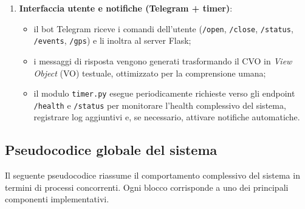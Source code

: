 \begin{enumerate}
\begin{itemize}
                risposta alle richieste \texttt{/status}, \texttt{/logs},
                \texttt{/gps/update}, ecc.;
          \item esposizione delle API REST per l’apertura/chiusura remota
                (FR1–FR2) e per la consultazione dello stato (FR3, FR9).
        \end{itemize}
  \item \textbf{Interfaccia utente e notifiche (Telegram + timer)}:
        \begin{itemize}
          \item il bot Telegram riceve i comandi dell’utente
                (\texttt{/open}, \texttt{/close}, \texttt{/status},
                \texttt{/events}, \texttt{/gps}) e li inoltra al server Flask;
          \item i messaggi di risposta vengono generati trasformando il CVO in
                \textit{View Object} (VO) testuale, ottimizzato per la
                comprensione umana;
          \item il modulo \texttt{timer.py} esegue periodicamente richieste
                verso gli endpoint \texttt{/health} e \texttt{/status} per
                monitorare l’health complessivo del sistema, registrare log
                aggiuntivi e, se necessario, attivare notifiche automatiche.
        \end{itemize}
\end{enumerate}

\subsection{Pseudocodice globale del sistema}

Il seguente pseudocodice riassume il comportamento complessivo del sistema in
termini di processi concorrenti. Ogni blocco corrisponde a uno dei principali
componenti implementativi.

